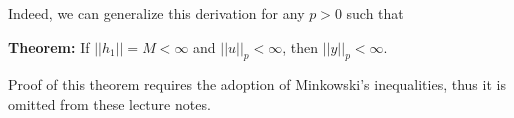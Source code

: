 \documentclass[twoside]{article}
\begin{document}
Indeed, we can generalize this derivation for any $p > 0$ such that

\textbf{Theorem:} If $|| h_1 || = M < \infty$ and $|| u ||_p < \infty$, then $|| y ||_p < \infty$. 

Proof of this theorem requires the adoption of Minkowski's inequalities, thus it is omitted from these lecture notes. 



\end{document}
